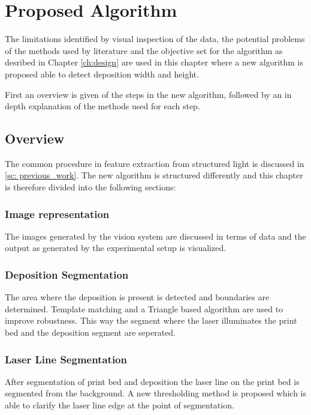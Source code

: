 \chapter{Proposed Algorithm}\label{ch:algorithm} 
The limitations identified by visual inspection of the data, the potential problems of the methods used by literature and the objective set for the algorithm as desribed in Chapter \ref{ch:design} are used in this chapter where a new algorithm is proposed able to detect deposition width and height. 

First an overview is given of the steps in the new algorithm, followed by an in depth explanation of the methods used for each step. 

\section{Overview}
The common procedure in feature extraction from structured light is discussed in \ref{sc: previous_work}. The new algorithm is structured differently and this chapter is therefore divided into the following sections:

\subsection*{Image representation}
The images generated by the vision system are discussed in terms of data and the output as generated by the experimental setup is visualized.

\subsection*{Deposition Segmentation} 
The area where the deposition is present is detected and boundaries are determined. Template matching and a Triangle based algorithm are used to improve robustness. This way the segment where the laser illuminates the print bed and the deposition segment are seperated.

\subsection*{Laser Line Segmentation} 
After segmentation of print bed and deposition the laser line on the print bed is segmented from the background. A new thresholding method is proposed which is able to clarify the laser line edge at the point of segmentation. 

